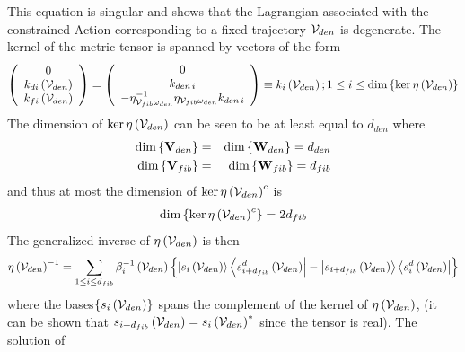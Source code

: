 This equation is singular and shows that the Lagrangian associated with the
constrained Action corresponding to a fixed trajectory ${\cal V}_{den}$ is
degenerate. The kernel of the metric tensor is spanned by vectors of the
form 
\begin{equation}
\left( 
\begin{array}{c}
0 \\ 
k_{di}\left( {\cal V}_{den}\right) \\ 
k_{fi}\left( {\cal V}_{den}\right)%
\end{array}%
\right) =\left( 
\begin{array}{c}
0 \\ 
k_{den\,i} \\ 
-\eta _{{\cal V}_{fib}\omega _{den}}^{-1}\eta _{{\cal V}_{fib}\omega
_{den}}k_{den\,i}%
\end{array}%
\right) \equiv k_{i}\left( {\cal V}_{den}\right) ;1\leq i\leq \dim \left\{
\ker \eta \left( {\cal V}_{den}\right) \right\}
\end{equation}%
The dimension of $\ker \eta \left( {\cal V}_{den}\right) $ can be seen to be
at least equal to $d_{den}$ where 
\begin{eqnarray}
\dim \left\{ {\bf V}_{den}\right\} &=&\dim \left\{ {\bf W}_{den}\right\}
=d_{den}  \nonumber \\
\dim \left\{ {\bf V}_{fib}\right\} &=&\dim \left\{ {\bf W}_{fib}\right\}
=d_{fib}
\end{eqnarray}%
and thus at most the dimension of $\ker \eta \left( {\cal V}_{den}\right)
^{c}$ is 
\begin{equation}
\dim \left\{ \ker \eta \left( {\cal V}_{den}\right) ^{c}\right\} =2d_{fib}
\end{equation}%
The generalized inverse of $\eta \left( {\cal V}_{den}\right) $ is then 
\begin{equation}
\eta \left( {\cal V}_{den}\right) ^{-1}=\sum_{1\leq i\leq d_{fib}}\beta
_{i}^{-1}\left( {\cal V}_{den}\right) \left\{ \left| s_{i}\left( {\cal V}%
_{den}\right) \right\rangle \left\langle s_{i+d_{fib}}^{d}\left( {\cal V}%
_{den}\right) \right| -\left| s_{i+d_{fib}}\left( {\cal V}_{den}\right)
\right\rangle \left\langle s_{i}^{d}\left( {\cal V}_{den}\right) \right|
\right\}
\end{equation}%
where the bases$\left\{ s_{i}\left( {\cal V}_{den}\right) \right\} $ spans
the complement of the kernel of $\eta \left( {\cal V}_{den}\right) $, (it
can be shown that $s_{i+d_{fib}}\left( {\cal V}_{den}\right) =s_{i}\left( 
{\cal V}_{den}\right) ^{\ast }$ since the tensor is real). The solution of

